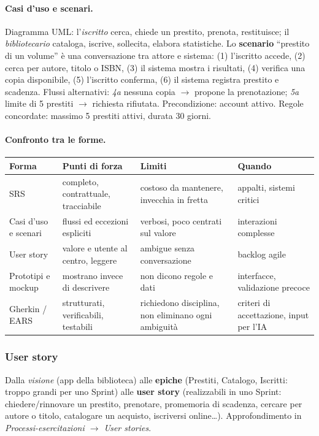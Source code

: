 \documentclass[a4paper,12pt]{article}
\begin{document}
\paragraph{Casi d'uso e scenari.} Diagramma UML: l'\emph{iscritto} cerca, chiede un prestito,
prenota, restituisce; il \emph{bibliotecario} cataloga, iscrive, sollecita, elabora
statistiche. Lo \textbf{scenario} ``prestito di un volume'' è una conversazione tra attore e
sistema: (1) l'iscritto accede, (2) cerca per autore, titolo o ISBN, (3) il sistema mostra i
risultati, (4) verifica una copia disponibile, (5) l'iscritto conferma, (6) il sistema
registra prestito e scadenza. Flussi alternativi: \emph{4a} nessuna copia $\to$ propone la
prenotazione; \emph{5a} limite di 5 prestiti $\to$ richiesta rifiutata. Precondizione:
account attivo. Regole concordate: massimo 5 prestiti attivi, durata 30 giorni.

\paragraph{Confronto tra le forme.}
\begin{center}
\small
\begin{tabular}{|l|p{3.5cm}|p{3.8cm}|p{3.4cm}|}
\hline
\textbf{Forma} & \textbf{Punti di forza} & \textbf{Limiti} & \textbf{Quando}\\
\hline
SRS & completo, contrattuale, tracciabile & costoso da mantenere, invecchia in fretta &
appalti, sistemi critici\\
\hline
Casi d'uso e scenari & flussi ed eccezioni espliciti & verbosi, poco centrati sul valore &
interazioni complesse\\
\hline
User story & valore e utente al centro, leggere & ambigue senza conversazione & backlog
agile\\
\hline
Prototipi e mockup & mostrano invece di descrivere & non dicono regole e dati & interfacce,
validazione precoce\\
\hline
Gherkin / EARS & strutturati, verificabili, testabili & richiedono disciplina, non eliminano
ogni ambiguità & criteri di accettazione, input per l'IA\\
\hline
\end{tabular}
\end{center}

\subsubsection{User story}
Dalla \emph{visione} (app della biblioteca) alle \textbf{epiche} (Prestiti, Catalogo,
Iscritti: troppo grandi per uno Sprint) alle \textbf{user story} (realizzabili in uno Sprint:
chiedere/rinnovare un prestito, prenotare, promemoria di scadenza, cercare per autore o
titolo, catalogare un acquisto, iscriversi online\dots). Approfondimento in
\emph{Processi-esercitazioni $\to$ User stories}.
\end{document}
